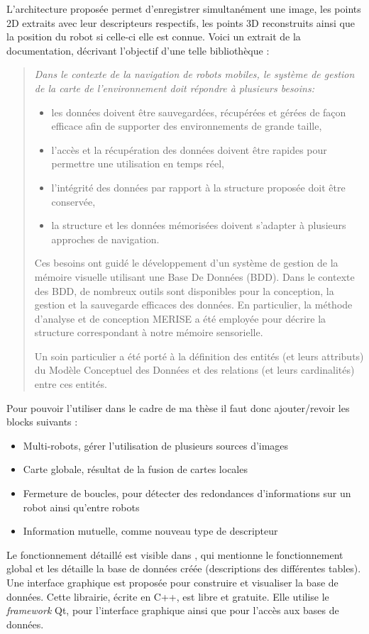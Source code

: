 L'architecture proposée permet d'enregistrer simultanément une image, les points 2D extraits avec leur descripteurs respectifs, les points 3D reconstruits ainsi que la position du robot si celle-ci elle est connue.
Voici un extrait de la documentation, décrivant l'objectif d'une telle bibliothèque :
\begin{quote}
\it Dans le contexte de la navigation de robots mobiles, le système de gestion de la carte de l'environnement doit répondre à plusieurs besoins:
\begin{itemize}
\item les données doivent être sauvegardées, récupérées et gérées de façon efficace afin de supporter des environnements de grande taille,
\item l'accès et la récupération des données doivent être rapides pour permettre une utilisation en temps réel,
\item l'intégrité des données par rapport à la structure proposée doit être conservée,
\item la structure et les données mémorisées doivent s'adapter à plusieurs approches de navigation.
\end{itemize}

Ces besoins ont guidé le développement d'un système de gestion de la mémoire visuelle utilisant une Base De Données (BDD). Dans le contexte des BDD, de nombreux outils sont disponibles pour la conception, la gestion et la sauvegarde efficaces des données. En particulier, la méthode d'analyse et de conception MERISE a été employée pour décrire la structure correspondant à notre mémoire sensorielle.

Un soin particulier a été porté à la définition des entités (et leurs attributs) du Modèle Conceptuel des Données et des relations (et leurs cardinalités) entre ces entités.
\end{quote}

Pour pouvoir l'utiliser dans le cadre de ma thèse il faut donc ajouter/revoir les blocks suivants :
\begin{itemize}
\item Multi-robots, gérer l'utilisation de plusieurs sources d'images
\item Carte globale, résultat de la fusion de cartes locales
\item Fermeture de boucles, pour détecter des redondances d'informations sur un robot ainsi qu'entre robots
\item Information mutuelle, comme nouveau type de descripteur
\end{itemize}


\vspace{5mm}
Le fonctionnement détaillé est visible dans \cite{Lequievre08}, qui mentionne le fonctionnement global et les détaille la base de données créée (descriptions des différentes tables).
Une interface graphique est proposée pour construire et visualiser la base de données.
Cette librairie, écrite en C++, est libre et gratuite.
Elle utilise le \emph{framework} Qt, pour l'interface graphique ainsi que pour l'accès aux bases de données.
